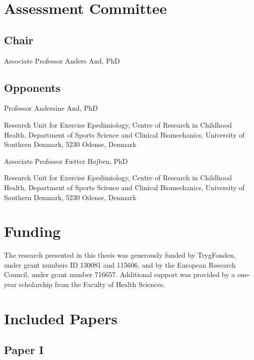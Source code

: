 \documentclass[
  8pt,
  letterpaper,
  DIV=11,
  numbers=noendperiod]{scrartcl}
\begin{document}
\hypertarget{assessment-committee}{%
\section{Assessment Committee}\label{assessment-committee}}

\hypertarget{chair}{%
\subsection{Chair}\label{chair}}

Associate Professor Anders And, PhD

\hypertarget{opponents}{%
\subsection{Opponents}\label{opponents}}

Professor Andersine And, PhD

Research Unit for Exercise Epedimiology, Centre of Research in Childhood
Health, Department of Sports Science and Clinical Biomechanics,
University of Southern Denmark, 5230 Odense, Denmark

Associate Professor Fætter Højben, PhD

Research Unit for Exercise Epedimiology, Centre of Research in Childhood
Health, Department of Sports Science and Clinical Biomechanics,
University of Southern Denmark, 5230 Odense, Denmark

\hypertarget{funding}{%
\section{Funding}\label{funding}}

The research presented in this thesis was generously funded by
TrygFonden, under grant numbers ID 130081 and 115606, and by the
European Research Council, under grant number 716657. Additional support
was provided by a one-year scholarship from the Faculty of Health
Sciences.

\newpage

\hypertarget{included-papers}{%
\section{Included Papers}\label{included-papers}}

\hypertarget{paper-i}{%
\subsection{Paper I}\label{paper-i}}
\end{document}
